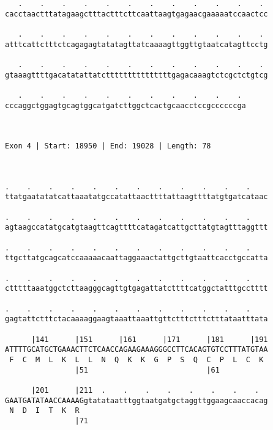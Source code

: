 \documentclass{article}
\begin{document}
\begin{Verbatim}
   .    .    .    .    .    .    .    .    .    .    .    . 
cacctaactttatagaagctttactttcttcaattaagtgagaacgaaaaatccaactcc
                                                            
   .    .    .    .    .    .    .    .    .    .    .    . 
atttcattctttctcagagagtatatagttatcaaaagttggttgtaatcatagttcctg
                                                            
   .    .    .    .    .    .    .    .    .    .    .    . 
gtaaagttttgacatatattatctttttttttttttttgagacaaagtctcgctctgtcg
                                                            
   .    .    .    .    .    .    .    .    .    .    . 
cccaggctggagtgcagtggcatgatcttggctcactgcaacctccgccccccga
                                                       
                                                       
 
Exon 4 | Start: 18950 | End: 19028 | Length: 78



.    .    .    .    .    .    .    .    .    .    .    .    
ttatgaatatatcattaaatatgccatattaacttttattaagttttatgtgatcataac
                                                            
.    .    .    .    .    .    .    .    .    .    .    .    
agtaagccatatgcatgtaagttcagttttcatagatcattgcttatgtagtttaggttt
                                                            
.    .    .    .    .    .    .    .    .    .    .    .    
ttgcttatgcagcatccaaaaacaattaggaaactattgcttgtaattcacctgccatta
                                                            
.    .    .    .    .    .    .    .    .    .    .    .    
ctttttaaatggctcttaagggcagttgtgagattatcttttcatggctatttgcctttt
                                                            
.    .    .    .    .    .    .    .    .    .    .    .    
gagtattctttctacaaaaggaagtaaattaaattgttctttctttctttataatttata
                                                            
      |141      |151      |161      |171      |181      |191
ATTTTGCATGCTGAAACTTCTCAACCAGAAGAAAGGGCCTTCACAGTGTCCTTTATGTAA
 F  C  M  L  K  L  L  N  Q  K  K  G  P  S  Q  C  P  L  C  K 
                |51                           |61           
  
      |201      |211  .    .    .    .    .    .    .    .  
GAATGATATAACCAAAAGgtatataatttggtaatgatgctaggttggaagcaaccacag
 N  D  I  T  K  R                                           
                |71                                         
  

\end{Verbatim}
\end{document}

